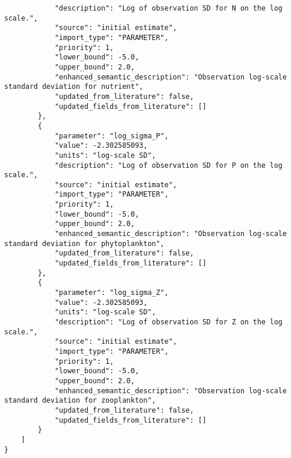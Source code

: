 \begin{lstlisting}
            "description": "Log of observation SD for N on the log scale.",
            "source": "initial estimate",
            "import_type": "PARAMETER",
            "priority": 1,
            "lower_bound": -5.0,
            "upper_bound": 2.0,
            "enhanced_semantic_description": "Observation log-scale standard deviation for nutrient",
            "updated_from_literature": false,
            "updated_fields_from_literature": []
        },
        {
            "parameter": "log_sigma_P",
            "value": -2.302585093,
            "units": "log-scale SD",
            "description": "Log of observation SD for P on the log scale.",
            "source": "initial estimate",
            "import_type": "PARAMETER",
            "priority": 1,
            "lower_bound": -5.0,
            "upper_bound": 2.0,
            "enhanced_semantic_description": "Observation log-scale standard deviation for phytoplankton",
            "updated_from_literature": false,
            "updated_fields_from_literature": []
        },
        {
            "parameter": "log_sigma_Z",
            "value": -2.302585093,
            "units": "log-scale SD",
            "description": "Log of observation SD for Z on the log scale.",
            "source": "initial estimate",
            "import_type": "PARAMETER",
            "priority": 1,
            "lower_bound": -5.0,
            "upper_bound": 2.0,
            "enhanced_semantic_description": "Observation log-scale standard deviation for zooplankton",
            "updated_from_literature": false,
            "updated_fields_from_literature": []
        }
    ]
}
\end{lstlisting}

